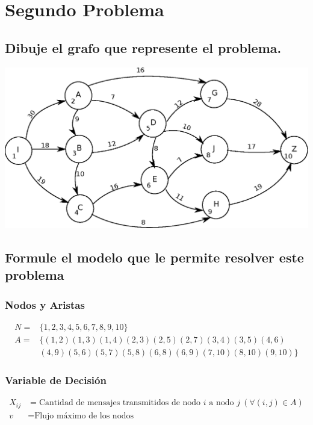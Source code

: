 \documentclass[a4paper,12pt]{article}
\begin{document}
\section{Segundo Problema}
\subsection{Dibuje el grafo que represente el problema.}
\includegraphics[scale=1]{drawing.eps}
\subsection{Formule el modelo que le permite resolver este problema}
\subsubsection{Nodos y Aristas}
\begin{equation*}
\begin{split}
	N = &\{1,2,3,4,5,6,7,8,9,10\} \\
	A = &\{ (1,2)(1,3)(1,4)(2,3)(2,5)(2,7)(3,4)(3,5)(4,6)\\
	  &(4,9)(5,6)(5,7)(5,8)(6,8)(6,9)(7,10)(8,10)(9,10) \}
\end{split}
\end{equation*}
\subsubsection{Variable de Decisión}
\begin{equation*}
\begin{split}
	X_{ij} &= \text{Cantidad de mensajes transmitidos de nodo } i \text{ a nodo } j \ (\forall(i,j)\in A)\\
	v &= \text{Flujo máximo de los nodos}
\end{split}
\end{equation*}
\end{document}
